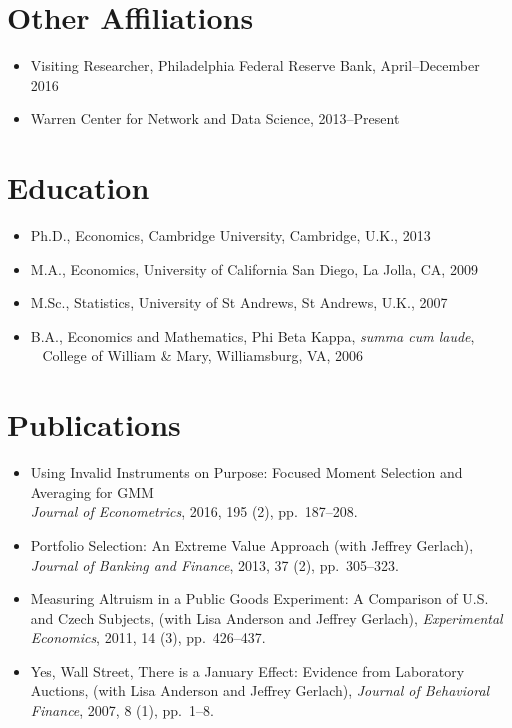 \documentclass[line,overlapped]{myres}
\begin{document}
\begin{resume}
\section{\sc Other Affiliations}
\begin{itemize}
\item Visiting Researcher, Philadelphia Federal Reserve Bank, April--December 2016
\item Warren Center for Network and Data Science, 2013--Present
\end{itemize}

\section{\sc Education}
\begin{itemize}
\item Ph.D., Economics, Cambridge University, Cambridge, U.K., 2013
\item M.A., Economics, University of California San Diego, La Jolla, CA, 2009
\item M.Sc., Statistics, University of St Andrews, St Andrews, U.K., 2007
\item B.A., Economics and Mathematics, Phi Beta Kappa, \emph{summa cum laude},\\ 
  \-\ \hspace{1em} College of William \& Mary, Williamsburg, VA, 2006
\end{itemize}




\section{\sc Publications}
\begin{itemize}
  \item Using Invalid Instruments on Purpose: Focused Moment Selection and Averaging for GMM\\ \emph{Journal of Econometrics}, 2016, 195 (2), pp.\ 187--208.
	\item Portfolio Selection: An Extreme Value Approach (with Jeffrey Gerlach), \emph{Journal of Banking and Finance}, 2013, 37 (2), pp.\ 305--323.
	\item Measuring Altruism in a Public Goods Experiment:  A Comparison of U.S. and Czech Subjects, (with Lisa Anderson and Jeffrey Gerlach), \emph{Experimental Economics}, 2011, 14 (3), pp.\ 426--437.
	\item Yes, Wall Street, There is a January Effect: Evidence from Laboratory Auctions, (with Lisa Anderson and Jeffrey Gerlach), \emph{Journal of Behavioral Finance}, 2007, 8 (1), pp.\ 1--8. 
\end{itemize}



\end{resume}
\end{document}
